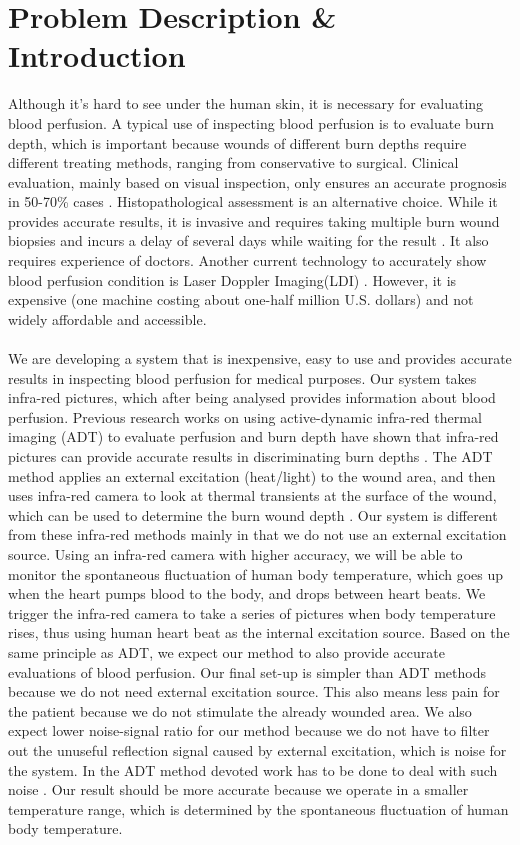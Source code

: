 \documentclass[paper=letter, fontsize=11pt]{scrartcl}
\numberwithin{equation}{section}		%
\numberwithin{figure}{section}			%
\numberwithin{table}{section}			%
\begin{document}
\section{Problem Description \& Introduction}
Although it's hard to see under the human skin, it is necessary for evaluating blood perfusion.
A typical use of inspecting blood perfusion is to evaluate burn depth, which is important because wounds of different 
burn depths require different treating methods, ranging from conservative to surgical. Clinical evaluation,
mainly based on visual inspection, only ensures an accurate prognosis in 50-70\% cases \cite{Renkielska}. Histopathological
assessment is an alternative choice. While it provides accurate results, it is invasive and requires taking multiple
burn wound biopsies and incurs a delay of several days while waiting for the result \cite{Renkielska}. It also requires 
experience of doctors. Another current technology to accurately show
blood perfusion condition is Laser Doppler Imaging(LDI) \cite{Pape}. However, it is expensive (one machine costing
about one-half million U.S. dollars) and not widely affordable and accessible.\\
\\
We are developing a system that is inexpensive, easy to use and provides accurate results in inspecting blood perfusion
for medical purposes. Our system takes infra-red pictures, which after being analysed provides information
about blood perfusion. Previous research works on using active-dynamic infra-red thermal imaging (ADT)
to evaluate perfusion and burn depth have shown that infra-red pictures can provide accurate results in
discriminating burn depths \cite{Renkielska}\cite{Ruminski}. The ADT method applies an external excitation (heat/light) to the wound area, and then uses
infra-red camera to look at thermal transients at the surface of the wound, which can be used to determine
the burn wound depth \cite{Renkielska}\cite{Ruminski}. Our system is different from these infra-red methods mainly in that
we do not use an external excitation source. Using an infra-red camera with higher accuracy, we will be able
to monitor the spontaneous fluctuation of human body temperature, which goes up when the heart pumps blood
to the body, and drops between heart beats. We trigger the infra-red camera to take a series of pictures
when body temperature rises, thus using human heart beat as the internal excitation source. Based on
the same principle as ADT, we expect our method to also provide accurate evaluations of blood perfusion. Our final
set-up is simpler than ADT methods because we do not need external excitation source. This also means less pain
for the patient because we do not stimulate the already wounded area. We also expect lower noise-signal ratio for
our method because we do not have to filter out the unuseful reflection signal caused by external excitation, which 
is noise for the system. In the ADT method devoted work has to be done to deal with such noise \cite{Ruminski}.
Our result should be more accurate because we operate in a smaller temperature range, which is determined by the
spontaneous fluctuation of human body temperature.
\end{document}
